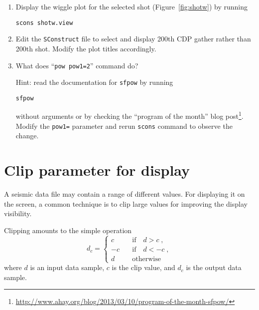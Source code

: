 \begin{enumerate}
\answer{

}       


\item Display the wiggle plot for the selected shot (Figure~\ref{fig:shotw}) by running
\begin{verbatim}
scons shotw.view
\end{verbatim}


\item Edit the \texttt{SConstruct} file to select and display 200th CDP gather rather than 200th shot. Modify the plot titles accordingly. 

\item What does ``\texttt{pow pow1=2}'' command do? 

\answer{

}       

Hint: read the documentation for \texttt{sfpow} by running
\begin{verbatim}
sfpow
\end{verbatim}
without arguments or by checking the ``program of the month'' blog
post\footnote{\url{http://www.ahay.org/blog/2013/03/10/program-of-the-month-sfpow/}}. Modify
the \texttt{pow1=} parameter and rerun \texttt{scons} command to
observe the change.

\end{enumerate}

\lstset{language=python,numbers=left,numberstyle=\tiny,showstringspaces=false}


\section{Clip parameter for display}

A seismic data file may contain a range of different values. For
displaying it on the screen, a common technique is to clip large
values for improving the display visibility.

Clipping amounts to the simple operation
\begin{equation}
d_c = \left\{\begin{array}{rl} c & \quad \mbox{if} \quad d > c\;, \\ -c & \quad \mbox{if} \quad d < -c\;, \\ d & \quad \mbox{otherwise}\end{array}\right.
\end{equation}
where $d$ is an input data sample, $c$ is the clip value, and $d_c$ is the output data sample.


